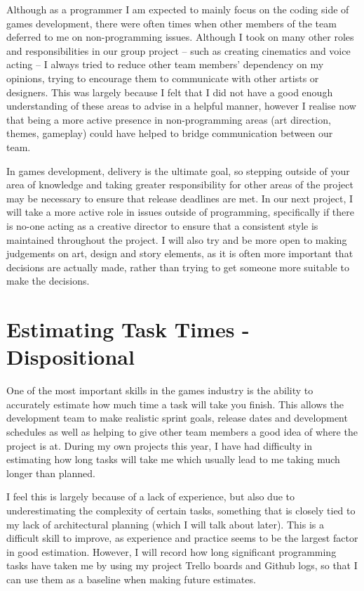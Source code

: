 \documentclass{scrartcl}
\begin{document}
Although as a programmer I am expected to mainly focus on the coding side of games development, there were often times when other members of the team deferred to me on non-programming issues. Although I took on many other roles and responsibilities in our group project – such as creating cinematics and voice acting – I always tried to reduce other team members’ dependency on my opinions, trying to encourage them to communicate with other artists or designers. This was largely because I felt that I did not have a good enough understanding of these areas to advise in a helpful manner, however I realise now that being a more active presence in non-programming areas (art direction, themes, gameplay) could have helped to bridge communication between our team.

In games development, delivery is the ultimate goal, so stepping outside of your area of knowledge and taking greater responsibility for other areas of the project may be necessary to ensure that release deadlines are met. In our next project, I will take a more active role in issues outside of programming, specifically if there is no-one acting as a creative director to ensure that a consistent style is maintained throughout the project. I will also try and be more open to making judgements on art, design and story elements, as it is often more important that decisions are actually made, rather than trying to get someone more suitable to make the decisions.



\section{Estimating Task Times - Dispositional}

One of the most important skills in the games industry is the ability to accurately estimate how much time a task will take you finish. This allows the development team to make realistic sprint goals, release dates and development schedules as well as helping to give other team members a good idea of where the project is at. During my own projects this year, I have had difficulty in estimating how long tasks will take me which usually lead to me taking much longer than planned. 

I feel this is largely because of a lack of experience, but also due to underestimating the complexity of certain tasks, something that is closely tied to my lack of architectural planning (which I will talk about later). This is a difficult skill to improve, as experience and practice seems to be the largest factor in good estimation. However, I will record how long significant programming tasks have taken me by using my project Trello boards and Github logs, so that I can use them as a baseline when making future estimates.
\end{document}
